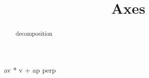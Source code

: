 \documentclass{ximera}
\title{Axes}
\begin{document}
\begin{abstract}
decomposition
\end{abstract}
\maketitle








av * v + ap perp
\end{document}
